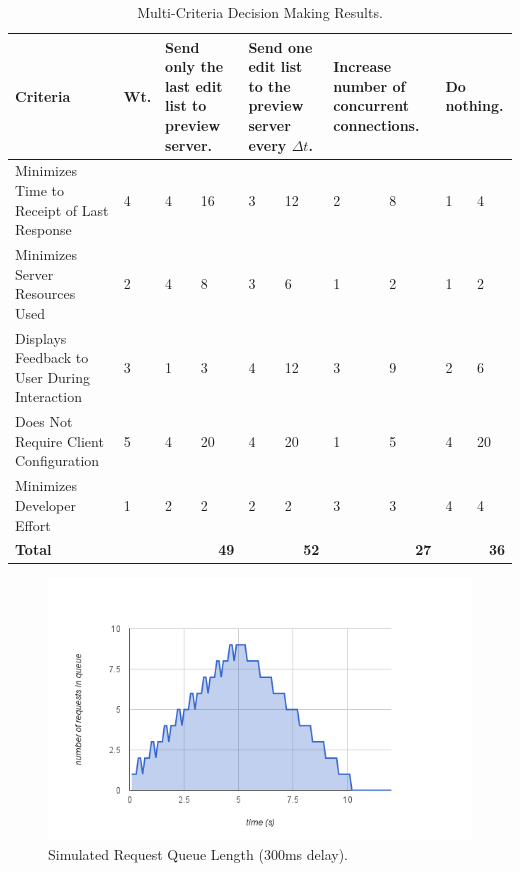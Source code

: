 \documentclass[se,resubmit]{uw-wkrpt}
\begin{document}
\begin{table}
  \caption{Multi-Criteria Decision Making Results.}
  \label{tbl:mcdm}
  \centering
  \begin{tabular}{|p{2.0cm}|p{1.0cm}|p{1.25cm}|p{1.25cm}|p{1.25cm}|p{1.25cm}|
                                     p{1.25cm}|p{1.25cm}|p{1.25cm}|p{1.25cm}|}
    \hline
    \textbf{Criteria} &
    \textbf{Wt.} &
    \multicolumn{2}{|p{2.5cm}|}{\textbf{Send only the last edit list to preview
    server.}} &
    \multicolumn{2}{|p{2.5cm}|}{\textbf{Send one edit list to the preview
    server every $\Delta t$.}} &
    \multicolumn{2}{|p{2.5cm}|}{\textbf{Increase number of concurrent
    connections.}} &
    \multicolumn{2}{|p{2.5cm}|}{\textbf{Do nothing.}} \\
    \hline\hline
    Minimizes Time to Receipt of Last Response &
       4 &  4 & 16 &  3 & 12 &  2 &  8 &  1 &  4 \\
    \hline
    Minimizes Server Resources Used &
       2 &  4 &  8 &  3 &  6 &  1 &  2 &  1 &  2 \\
    \hline
    Displays Feedback to User During Interaction &
       3 &  1 &  3 &  4 & 12 &  3 &  9 &  2 &  6 \\
    \hline
    Does Not Require Client Configuration &
       5 &  4 & 20 &  4 & 20 &  1 &  5 &  4 & 20 \\
    \hline
    Minimizes Developer Effort &
       1 &  2 &  2 &  2 &  2 &  3 &  3 &  4 &  4 \\
    \hline
    \hline
    \textbf{Total} &
      &
      \multicolumn{2}{|r|}{\textbf{49}} &
      \multicolumn{2}{|r|}{\textbf{52}} &
      \multicolumn{2}{|r|}{\textbf{27}} &
      \multicolumn{2}{|r|}{\textbf{36}} \\
    \hline
  \end{tabular}
\end{table}

\begin{figure}
  \centering
  \includegraphics{sim-300ms}
  \caption{Simulated Request Queue Length (300ms delay).}
  \label{fig:sim-300ms}
\end{figure}
\end{document}
